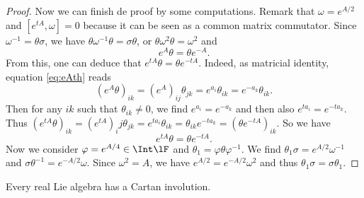 \begin{proof}
Now we can finish de proof by some computations. Remark that $\omega=e^{A/2}$ and $[e^{tA},\omega]=0$ because it can be seen as a common matrix commutator. Since $\omega^{-1}=\theta\sigma$, we have $\theta\omega^{-1}\theta=\sigma\theta$, or $\theta\omega^2\theta=\omega^2$ and
\begin{equation}\label{eq:eAth}
   e^{A}\theta=\theta e^{-A}.
\end{equation}
From this, one can deduce that $e^{tA}\theta=\theta e^{-tA}$. Indeed, as matricial identity, equation \eqref{eq:eAth} reads
\[
    (e^{A}\theta)_{ik}=(e^{A})_{ij}\theta_{jk}
                      =e^{a_i}\theta_{ik}
              =e^{-a_k}\theta_{ik}.
\]
Then for any $ik$ such that $\theta_{ik}\neq 0$, we find $e^{a_i}=e^{-a_k}$ and then also $e^{ta_i}=e^{-ta_k}$. Thus $(e^{tA}\theta)_{ik}=(e^{tA})_ij\theta_{jk}=e^{ta_i}\theta_{ik}=\theta_{ik}e^{-ta_k}=(\theta e^{-tA})_{ik}$. So we have
\begin{equation}
  e^{tA}\theta=\theta e^{-tA}.
\end{equation}
Now we consider $\varphi=e^{A/4}\in\Int\lF$ and $\theta_1=\varphi\theta\varphi^{-1}$. We find $\theta_1\sigma=e^{A/2}\omega^{-1}$ and $\sigma\theta^{-1}=e^{-A/2}\omega$. Since $\omega^2=A$, we have $e^{A/2}=e^{-A/2}\omega^2$ and thus $\theta_1\sigma=\sigma\theta_1$.

\end{proof}

\begin{corollary}
    Every real Lie algebra has a Cartan involution.
\end{corollary}

